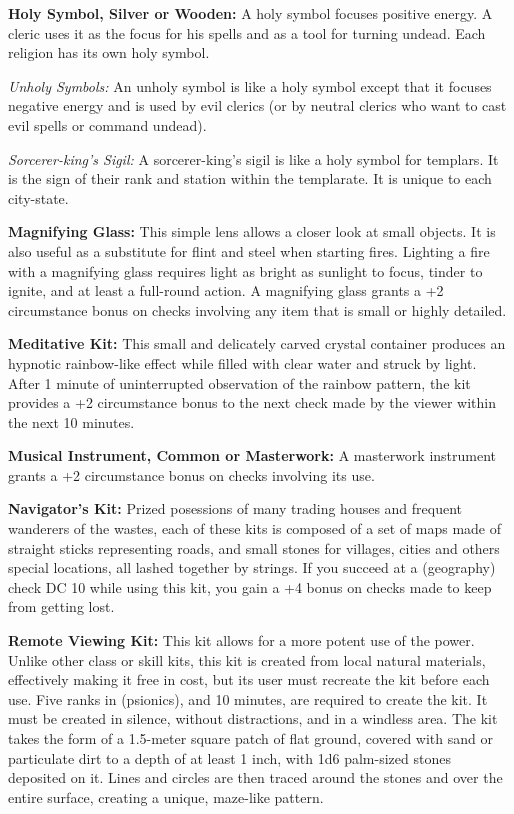 \textbf{Holy Symbol, Silver or Wooden:} A holy symbol focuses positive energy. A cleric uses it as the focus for his spells and as a tool for turning undead. Each religion has its own holy symbol.

 \textit{Unholy Symbols:} An unholy symbol is like a holy symbol except that it focuses negative energy and is used by evil clerics (or by neutral clerics who want to cast evil spells or command undead).

 \textit{Sorcerer-king's Sigil:} A sorcerer-king's sigil is like a holy symbol for templars. It is the sign of their rank and station within the templarate. It is unique to each city-state.

\textbf{Magnifying Glass:} This simple lens allows a closer look at small objects. It is also useful as a substitute for flint and steel when starting fires. Lighting a fire with a magnifying glass requires light as bright as sunlight to focus, tinder to ignite, and at least a full-round action. A magnifying glass grants a +2 circumstance bonus on  checks involving any item that is small or highly detailed.

\textbf{Meditative Kit:} This small and delicately carved crystal container produces an hypnotic rainbow-like effect while filled with clear water and struck by light. After 1 minute of uninterrupted observation of the rainbow pattern, the kit provides a +2 circumstance bonus to the next  check made by the viewer within the next 10 minutes.

\textbf{Musical Instrument, Common or Masterwork:} A masterwork instrument grants a +2 circumstance bonus on  checks involving its use.

\textbf{Navigator's Kit:} Prized posessions of many trading houses and frequent wanderers of the wastes, each of these kits is composed of a set of maps made of straight sticks representing roads, and small stones for villages, cities and others special locations, all lashed together by strings. If you succeed at a  (geography) check DC 10 while using this kit, you gain a +4 bonus on  checks made to keep from getting lost.

\textbf{Remote Viewing Kit:} This kit allows for a more potent use of the  power. Unlike other class or skill kits, this kit is created from local natural materials, effectively making it free in cost, but its user must recreate the kit before each use. Five ranks in  (psionics), and 10 minutes, are required to create the kit. It must be created in silence, without distractions, and in a windless area. The kit takes the form of a 1.5-meter square patch of flat ground, covered with sand or particulate dirt to a depth of at least 1 inch, with 1d6 palm-sized stones deposited on it. Lines and circles are then traced around the stones and over the entire surface, creating a unique, maze-like pattern.

